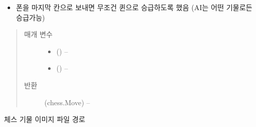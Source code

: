 \documentclass[letterpaper,10pt,english]{sphinxmanual}
\begin{document}
\begin{fulllineitems}
\begin{fulllineitems}
\begin{itemize}
\item {} 
폰을 마지막 칸으로 보내면 무조건 퀸으로 승급하도록 했음 (AI는 어떤 기물로든 승급가능)

\end{itemize}
\begin{quote}\begin{description}
\item[{매개 변수}] \leavevmode\begin{itemize}
\item {} 
 ({\hyperref[\detokenize{scripts:scripts.run_game.State}]{}}) -- 

\item {} 
 () -- 

\end{itemize}

\item[{반환}] \leavevmode
(chess.Move) --

\end{description}\end{quote}

\end{fulllineitems}


\begin{fulllineitems}
\label{\detokenize{scripts:scripts.chess_board.ChessBoard.width}}
\end{fulllineitems}


\end{fulllineitems}


\begin{fulllineitems}
\label{\detokenize{scripts:scripts.chess_board.micro_to_std}}
체스 기물 이미지 파일 경로

\end{fulllineitems}
\end{document}
